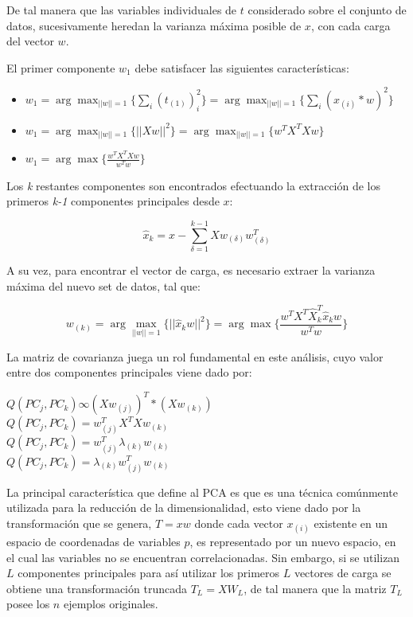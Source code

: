 De tal manera que las variables individuales de $t$ considerado sobre el conjunto de datos, sucesivamente heredan la varianza máxima posible de $x$, con cada carga del vector $w$.

El primer componente $ w_{{1}} $ debe satisfacer las siguientes características:

\begin{itemize}
	
	\item $w_{1} = \arg \max_{||w||=1} \{\sum_{i}(t_{(1)})^{2}_{i}\} = \arg \max_{||w||=1} \{\sum_{i}(x_{(i)}*w)^{2}\}$
	
	\item $w_{1} = \arg \max_{||w||=1} \{||Xw||^{2}\} = \arg \max_{||w||=1} \{w^{T}X^{T}Xw\}$
	
	\item $w_{1} = \arg \max \{\frac{w^{T}X^{T}Xw}{w^{T}w}\}$
	
\end{itemize}

Los \textit{k} restantes componentes son encontrados efectuando la extracción de los primeros \textit{k-1} componentes principales desde $x$:

\begin{equation}
	\hat{x}_{k} = x - \sum_{\delta=1}^{k-1}Xw_{(\delta)}w^{T}_{(\delta)}
\end{equation}

A su vez, para encontrar el vector de carga, es necesario extraer la varianza máxima del nuevo set de datos, tal que:

\begin{equation}
	w_{(k)} = \arg \max_{||w||=1} \{||\hat{x}_{k}w||^{2}\} = \arg \max \{\frac{w^{T}X^{T}\hat{X}^{T}_{k}\hat{x}_{k}w}{w^{T}w}\}
\end{equation}

La matriz de covarianza juega un rol fundamental en este análisis, cuyo valor entre dos componentes principales viene dado por:
\begin{center}
	$Q(PC_{j}, PC_{k}) \infty (Xw_{(j)})^{T} * (Xw_{(k)})$\\
	$Q(PC_{j}, PC_{k}) = w_{(j)}^{T}X^{T}Xw_{(k)}$\\
	$Q(PC_{j}, PC_{k}) = w_{(j)}^{T}\lambda_{(k)}w_{(k)}$\\
	$Q(PC_{j}, PC_{k}) = \lambda_{(k)}w_{(j)}^{T}w_{(k)}$	
\end{center}


La principal característica que define al PCA es que es una técnica comúnmente utilizada para la reducción de la dimensionalidad, esto viene dado por la transformación que se genera, $ T = xw $ donde cada vector $ x_{(i)} $ existente en un espacio de coordenadas de variables $p$, es representado por un nuevo espacio, en el cual las variables no se encuentran correlacionadas. Sin embargo, si se utilizan $ L $ componentes principales para así utilizar los primeros $ L $ vectores de carga se obtiene una transformación truncada $ T_{L} = XW_{L} $, de tal manera que la matriz $ T_{L} $ posee los $n$ ejemplos originales. 


